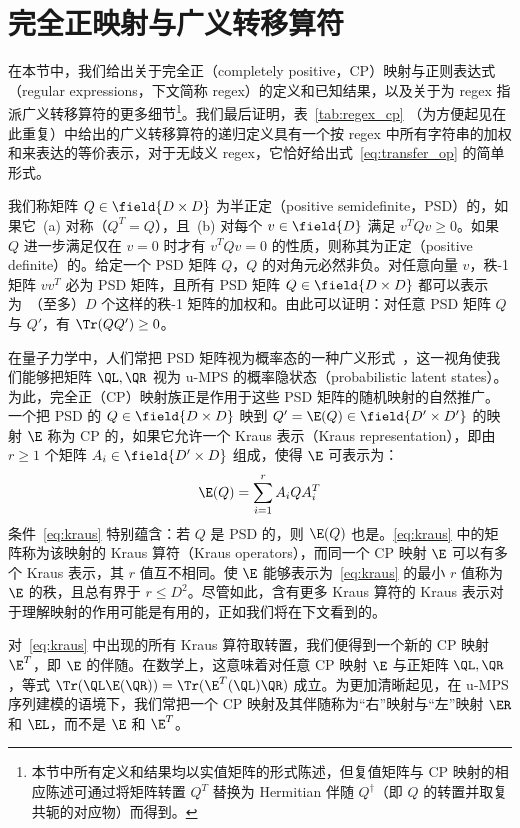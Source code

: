 \section{完全正映射与广义转移算符}
\label{sec:appendix_a}

在本节中，我们给出关于完全正（completely positive，CP）映射与正则表达式（regular expressions，下文简称 regex）的定义和已知结果，以及关于为 regex 指派广义转移算符的更多细节\footnote{本节中所有定义和结果均以实值矩阵的形式陈述，但复值矩阵与 CP 映射的相应陈述可通过将矩阵转置 $Q^T$ 替换为 Hermitian 伴随 $Q^\dagger$（即 $Q$ 的转置并取复共轭的对应物）而得到。}。我们最后证明，表~\ref{tab:regex_cp}
（为方便起见在此重复）中给出的广义转移算符的递归定义具有一个按 regex 中所有字符串的加权和来表达的等价表示，对于无歧义 regex，它恰好给出式~\ref{eq:transfer_op} 的简单形式。

我们称矩阵 $Q\in\field{D\times D}$ 为半正定（positive semidefinite，PSD）的，如果它~(a) 对称（$Q^T = Q$），且~(b) 对每个 $v\in\field{D}$ 满足 $v^T Q v \geq 0$。如果 $Q$ 进一步满足仅在 $v = 0$ 时才有 $v^T Q v = 0$ 的性质，则称其为正定（positive definite）的。给定一个 PSD 矩阵 $Q$，$Q$ 的对角元必然非负。对任意向量 $v$，秩-1 矩阵 $vv^T$ 必为 PSD 矩阵，且所有 PSD 矩阵 $Q\in\field{D\times D}$ 都可以表示为~（至多）$D$ 个这样的秩-1 矩阵的加权和。由此可以证明：对任意 PSD 矩阵 $Q$ 与 $Q'$，有 $\Tr(QQ') \geq0$。

在量子力学中，人们常把 PSD 矩阵视为概率态的一种广义形式~\citep{nielsen2002}，这一视角使我们能够把矩阵 $\QL, \QR$ 视为 u-MPS 的概率隐状态（probabilistic latent states）。为此，完全正（CP）映射族正是作用于这些 PSD 矩阵的随机映射的自然推广。一个把 PSD 的 $Q\in\field{D\times D}$ 映到 $Q'=\E(Q)\in\field{D'\times D'}$ 的映射 $\E$ 称为 CP 的，如果它允许一个 Kraus 表示（Kraus representation），即由 $r \geq 1$ 个矩阵 $A_i\in\field{D'\times D}$ 组成，使得 $\E$ 可表示为：
%
\begin{equation}
\label{eq:kraus}
\E(Q) = \sum_{i=1}^r A_i Q A_i^T
\end{equation}
%
条件~\eqref{eq:kraus} 特别蕴含：若 $Q$ 是 PSD 的，则 $\E(Q)$ 也是。\eqref{eq:kraus} 中的矩阵称为该映射的 Kraus 算符（Kraus operators），而同一个 CP 映射 $\E$ 可以有多个 Kraus 表示，其 $r$ 值互不相同。使 $\E$ 能够表示为~\eqref{eq:kraus} 的最小 $r$ 值称为 $\E$ 的秩，且总有界于 $r \leq D^2$。尽管如此，含有更多 Kraus 算符的 Kraus 表示对于理解映射的作用可能是有用的，正如我们将在下文看到的。

对~\eqref{eq:kraus} 中出现的所有 Kraus 算符取转置，我们便得到一个新的 CP 映射 $\E^T$，即 $\E$ 的伴随。在数学上，这意味着对任意 CP 映射 $\E$ 与正矩阵 $\QL, \QR$，等式 $\Tr(\QL \E(\QR)) = \Tr(\E^T(\QL) \QR)$ 成立。为更加清晰起见，在 u-MPS 序列建模的语境下，我们常把一个 CP 映射及其伴随称为``右''映射与``左''映射 $\ER$ 和 $\EL$，而不是 $\E$ 和 $\E^T$。

